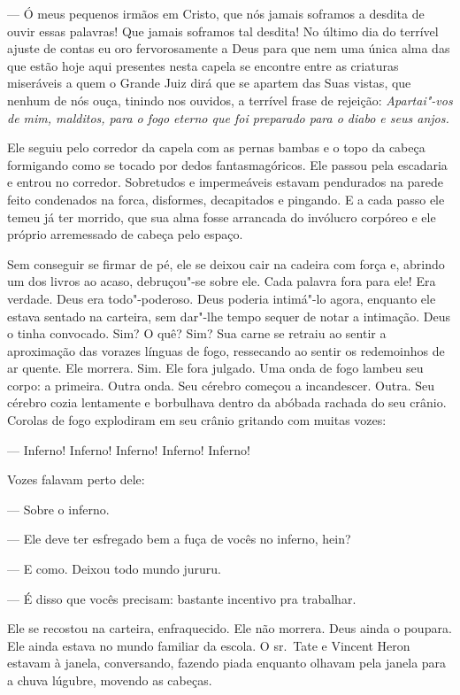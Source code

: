  --- Ó meus pequenos irmãos em Cristo, que nós jamais soframos a desdita de
ouvir essas palavras! Que jamais soframos tal desdita! No último dia do
terrível ajuste de contas eu oro fervorosamente a Deus para que nem uma
única alma das que estão hoje aqui presentes nesta capela se encontre
entre as criaturas miseráveis a quem o Grande Juiz dirá que se apartem
das Suas vistas, que nenhum de nós ouça, tinindo nos ouvidos, a
terrível frase de rejeição: \textit{Apartai"-vos de mim, malditos, para
o fogo eterno que foi preparado para o diabo e seus anjos.}

Ele seguiu pelo corredor da capela com as pernas bambas e o topo da
cabeça formigando como se tocado por dedos fantasmagóricos. Ele passou
pela escadaria e entrou no corredor. Sobretudos e impermeáveis estavam
pendurados na parede feito condenados na forca, disformes, decapitados
e pingando. E a cada passo ele temeu já ter morrido, que sua alma fosse
arrancada do invólucro corpóreo e ele próprio arremessado de cabeça
pelo espaço.

Sem conseguir se firmar de pé, ele se deixou cair na cadeira com força
e, abrindo um dos livros ao acaso, debruçou"-se sobre ele. Cada palavra
fora para ele! Era verdade. Deus era todo"-poderoso. Deus poderia
intimá"-lo agora, enquanto ele estava sentado na carteira, sem dar"-lhe
tempo sequer de notar a intimação. Deus o tinha convocado. Sim? O quê?
Sim? Sua carne se retraiu ao sentir a aproximação das vorazes línguas
de fogo, ressecando ao sentir os redemoinhos de ar quente. Ele morrera.
Sim. Ele fora julgado. Uma onda de fogo lambeu seu corpo: a primeira.
Outra onda. Seu cérebro começou a incandescer. Outra. Seu cérebro cozia
lentamente e borbulhava dentro da abóbada rachada do seu crânio.
Corolas de fogo explodiram em seu crânio gritando com muitas vozes:

 --- Inferno! Inferno! Inferno! Inferno! Inferno!

Vozes falavam perto dele:

 --- Sobre o inferno.

 --- Ele deve ter esfregado bem a fuça de vocês no inferno, hein?

 --- E como. Deixou todo mundo jururu.

 --- É disso que vocês precisam: bastante incentivo pra trabalhar.

Ele se recostou na carteira, enfraquecido. Ele não morrera. Deus ainda o
poupara. Ele ainda estava no mundo familiar da escola. O sr.~Tate e
Vincent Heron estavam à janela, conversando, fazendo piada enquanto
olhavam pela janela para a chuva lúgubre, movendo as cabeças.

